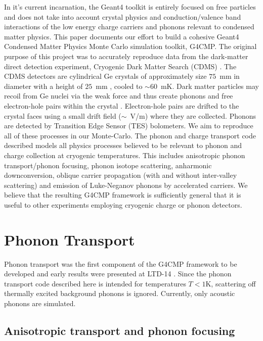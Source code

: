 \documentclass[final,3p,times,twocolumn]{elsarticle}
\begin{document}
In it's current incarnation, the Geant4 toolkit is entirely focused on free particles and does not take into account crystal physics and conduction/valence band interactions of the low energy charge carriers and phonons relevant to condensed matter physics. This paper documents our effort to build a cohesive Geant4 Condensed Matter Physics Monte Carlo simulation toolkit, G4CMP. The original purpose of this project was to accurately reproduce data from the dark-matter direct detection experiment, Cryogenic Dark Matter Search (CDMS) \cite{CDMS-A}\cite{CDMS-B}\cite{CDMS-C}. The CDMS detectors are cylindrical Ge crystals of approximately size $75$~mm in diameter with a height of $25$~mm \cite{CDMS-E}, cooled to $\sim60$~mK. Dark matter particles may recoil from Ge nuclei via the weak force and thus create phonons and free electron-hole pairs within the crystal \cite{Lindhart}. Electron-hole pairs are drifted to the crystal faces using a small drift field ($\sim$~V/m) where they are collected. Phonons are detected by Transition Edge Sensor (TES) bolometers. We aim to reproduce all of these processes in our Monte-Carlo. 
The phonon and charge transport code described models all physics processes believed to be relevant to phonon and charge collection at cryogenic temperatures. This includes anisotropic phonon transport/phonon focusing, phonon isotope scattering, anharmonic downconversion, oblique carrier propagation (with and without inter-valley scattering) and emission of Luke-Neganov phonons by accelerated carriers. We believe that the resulting G4CMP framework is sufficiently general that it is useful to other experiments employing cryogenic charge or phonon detectors. 

\section{Phonon Transport}
\label{sec:PhononTransport}

Phonon transport was the first component of the G4CMP framework to be developed and early results were presented at LTD-14 \cite{Brandt}. Since the phonon transport code described here is intended for temperatures $T<1$K, scattering off thermally excited background phonons is ignored. Currently, only acoustic phonons are simulated.

\subsection{Anisotropic transport and phonon focusing}
\label{sec:Focusing}
\end{document}
